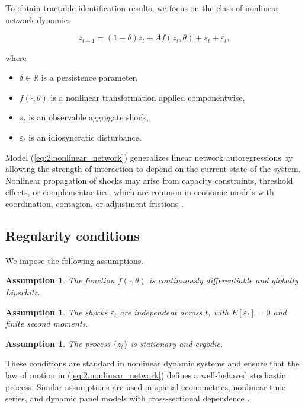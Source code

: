 \documentclass[12pt]{article}
\numberwithin{equation}{section}
\newtheorem{assumption}[theorem]{Assumption}
\begin{document}
To obtain tractable identification results, we focus on the class of nonlinear
network dynamics

\begin{equation}
z_{t+1}
=
(1-\delta) z_t
+
A f(z_t, \theta)
+
s_t
+
\varepsilon_t,
\label{eq:2.nonlinear_network}
\end{equation}

where

\begin{itemize}
\item $\delta \in \mathbb{R}$ is a persistence parameter,
\item $f(\cdot,\theta)$ is a nonlinear transformation applied componentwise,
\item $s_t$ is an observable aggregate shock,
\item $\varepsilon_t$ is an idiosyncratic disturbance.
\end{itemize}

Model (\ref{eq:2.nonlinear_network}) generalizes linear network autoregressions
by allowing the strength of interaction to depend on the current state of the
system. Nonlinear propagation of shocks may arise from capacity constraints,
threshold effects, or complementarities, which are common in economic models
with coordination, contagion, or adjustment frictions
\citep{cooper1998coordination, morris1998coordination, acemoglu2015systemic}.

\subsection{Regularity conditions}

We impose the following assumptions.

\begin{assumption}
The function $f(\cdot,\theta)$ is continuously differentiable and globally
Lipschitz.
\end{assumption}

\begin{assumption}
The shocks $\varepsilon_t$ are independent across $t$, with
$E[\varepsilon_t]=0$ and finite second moments.
\end{assumption}

\begin{assumption}
The process $\{z_t\}$ is stationary and ergodic.
\end{assumption}

These conditions are standard in nonlinear dynamic systems and ensure that the
law of motion in (\ref{eq:2.nonlinear_network}) defines a well-behaved stochastic
process. Similar assumptions are used in spatial econometrics, nonlinear time
series, and dynamic panel models with cross-sectional dependence
\citep{anselin1988spatial, arnold1998random, hirsch2013dynamical}.
\end{document}
